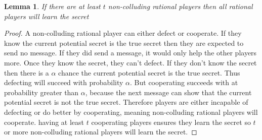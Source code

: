 \documentclass{dalcsthesis}
\newtheorem{lemma}{Lemma}
\begin{document}
\begin{lemma} If there are at least $t$ non-colluding rational players then all rational players will learn the secret \end{lemma}
\begin{proof}
A non-colluding rational player can either defect or cooperate. If they know the current potential secret is the true secret then they are expected to send no message. If they did send a message, it would only help the other players more. Once they know the secret, they can't defect. If they don't know the secret then there is a $\alpha$ chance the current potential secret is the true secret. Thus defecting will succeed with probability $\alpha$. But cooperating succeeds with at probability greater than $\alpha$, because the next message can show that the current potential secret is not the true secret. Therefore players are either incapable of defecting or do better by cooperating, meaning non-colluding rational players will cooperate. having at least $t$ cooperating players ensures they learn the secret so $t$ or more non-colluding rational players will learn the secret.
\end{proof}
\end{document}
